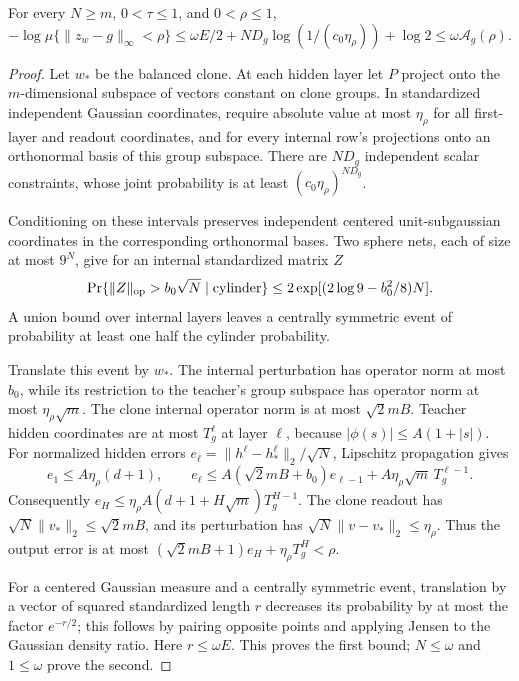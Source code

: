 \begin{lemma}
\label{ag-lem:general-activation-cylinder}
For every $N\geq m$, $0<\tau\leq1$, and $0<\rho\leq1$,
\[
 -\log\mu\{\|z_w-g\|_\infty<\rho\}
 \leq\omega E/2+ND_g\log(1/(c_0\eta_\rho))+\log2
 \leq\omega\mathcal A_g(\rho).
\]
\end{lemma}
\begin{proof}
Let $w_*$ be the balanced clone.  At each hidden layer let $P$ project
onto the $m$-dimensional subspace of vectors constant on clone groups.
In standardized independent Gaussian coordinates, require absolute
value at most $\eta_\rho$ for all first-layer and readout coordinates,
and for every internal row's projections onto an orthonormal basis of
this group subspace.  There are $ND_g$ independent scalar constraints,
whose joint probability is at least $(c_0\eta_\rho)^{ND_g}$.

Conditioning on these intervals preserves independent centered
unit-subgaussian coordinates in the corresponding orthonormal bases.
Two sphere nets, each of size at most $9^N$, give for an internal
standardized matrix $Z$
\[
 \Pr\{\|Z\|_{\rm op}>b_0\sqrt N\mid\text{cylinder}\}
 \leq2\exp[(2\log9-b_0^2/8)N].
\]
A union bound over internal layers leaves a centrally symmetric event
of probability at least one half the cylinder probability.

Translate this event by $w_*$.  The internal perturbation has operator
norm at most $b_0$, while its restriction to the teacher's group
subspace has operator norm at most $\eta_\rho\sqrt m$.
The clone internal operator norm is at most $\sqrt2mB$.
Teacher hidden coordinates are at most $T_g^\ell$ at layer $\ell$,
because $|\phi(s)|\leq A(1+|s|)$.
For normalized hidden errors $e_\ell=\|h^\ell-h_*^\ell\|_2/\sqrt N$,
Lipschitz propagation gives
\[
 e_1\leq A\eta_\rho(d+1),\qquad
 e_\ell\leq A(\sqrt2mB+b_0)e_{\ell-1}
                +A\eta_\rho\sqrt m\,T_g^{\ell-1}.
\]
Consequently
$e_H\leq\eta_\rho A(d+1+H\sqrt m)T_g^{H-1}$.
The clone readout has $\sqrt N\|v_*\|_2\leq\sqrt2mB$, and its
perturbation has $\sqrt N\|v-v_*\|_2\leq\eta_\rho$.
Thus the output error is at most
$(\sqrt2mB+1)e_H+\eta_\rho T_g^H<\rho$.

For a centered Gaussian measure and a centrally symmetric event,
translation by a vector of squared standardized length $r$ decreases
its probability by at most the factor $e^{-r/2}$; this follows by
pairing opposite points and applying Jensen to the Gaussian density
ratio.  Here $r\leq\omega E$.  This proves the first bound; $N\leq\omega$
and $1\leq\omega$ prove the second.
\end{proof}


